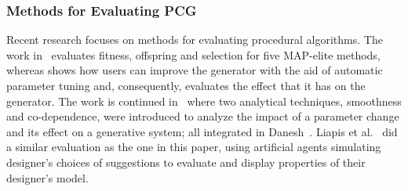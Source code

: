 
\subsubsection{Methods for Evaluating PCG}

Recent research %
focuses on methods for evaluating procedural algorithms. The work in~\cite{p9Gravina2019-blendingNotionsDiversity} %
evaluates fitness, offspring and selection for five MAP-elite methods, whereas %
\cite{p9Cook2016-SecondPaperDanesh} shows how users can improve the generator with the aid of automatic parameter tuning and, consequently, evaluates the effect that it has on the generator. The work is continued in~\cite{p9Cook2019:ParameterBasedEvaluation} where two analytical techniques, smoothness and co-dependence, were introduced to analyze the impact of a parameter change and its %
effect on a generative system; all integrated in Danesh~\cite{p9Cook2021-danesh}. Liapis et al.~\cite{p9Liapis2014-designerModelImpl} did a similar evaluation as the one in this paper, using artificial agents simulating designer's choices of suggestions to evaluate and display properties of their designer's model.%

